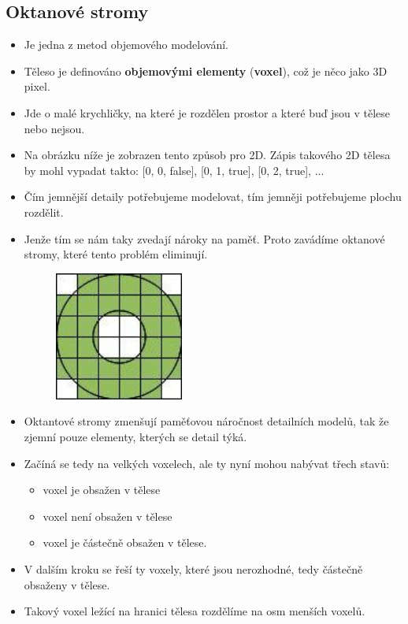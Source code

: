 \begin{itemize}
 \subsection{Oktanové stromy}
 \begin{itemize}
 	\item Je jedna z metod objemového modelování.
 	\item Těleso je definováno \textbf{objemovými elementy} (\textbf{voxel}), což je něco jako 3D pixel.
 	\item Jde o malé krychličky, na které je rozdělen prostor a které buď jsou v tělese nebo nejsou.
 	\item Na obrázku níže je zobrazen tento způsob pro 2D. Zápis takového 2D tělesa by mohl vypadat takto: [0, 0, false], [0, 1, true], [0, 2, true], ...
	\item Čím jemnější detaily potřebujeme modelovat, tím jemněji potřebujeme plochu rozdělit.
	\item Jenže tím se nám taky zvedají nároky na paměť. Proto zavádíme oktanové stromy, které tento problém eliminují.
		\begin{figure}[H]
		\centering
		\includegraphics[width=0.4\textwidth]{assets/4_octan}
		\end{figure}
	\item Oktantové stromy zmenšují paměťovou náročnost detailních modelů, tak že zjemní pouze elementy, kterých se detail týká.
	\item Začíná se tedy na velkých voxelech, ale ty nyní mohou nabývat třech stavů:	
	 \begin{itemize}
			\item voxel je obsažen v tělese
			\item voxel není obsažen v tělese
			\item voxel je částečně obsažen v tělese.
	\end{itemize}
	\item V dalším kroku se řeší ty voxely, které jsou nerozhodné, tedy částečně obsaženy v tělese.
	\item Takový voxel ležící na hranici tělesa rozdělíme na osm menších voxelů.

\end{itemize}
\end{itemize}
